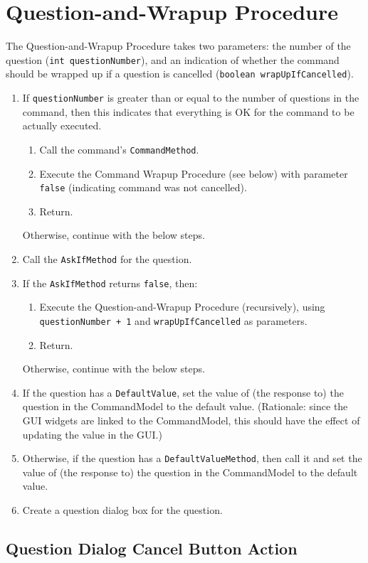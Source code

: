 \documentclass[11pt]{article}
\begin{document}
\section{Question-and-Wrapup Procedure}

The Question-and-Wrapup Procedure takes two parameters: the number of the
question ({\tt int questionNumber}), and an indication of whether the
command should be wrapped up if a question is cancelled
({\tt boolean wrapUpIfCancelled}).

\begin{enumerate}
\item If {\tt questionNumber} is greater than or equal to the number
  of questions in the command, then this indicates that everything
  is OK for the command to be actually executed.
  \begin{enumerate}
  \item Call the command's {\tt CommandMethod}.
  \item Execute the Command Wrapup Procedure (see below) with parameter
    {\tt false} (indicating command was not cancelled).
  \item Return.
  \end{enumerate}
  Otherwise, continue with the below steps.
\item Call the {\tt AskIfMethod} for the question.
\item If the {\tt AskIfMethod} returns {\tt false}, then:
  \begin{enumerate}
  \item Execute the Question-and-Wrapup Procedure
    (recursively), using {\tt questionNumber + 1} and {\tt wrapUpIfCancelled}
    as parameters.
  \item Return.
  \end{enumerate}
  Otherwise, continue with the below steps.
\item If the question  has a {\tt DefaultValue}, set the value of
  (the response to) the question in the CommandModel to the default value.
  (Rationale:  since the GUI widgets are linked to the CommandModel,
  this should have the effect of updating the value in the GUI.)
\item Otherwise, if the question has a {\tt DefaultValueMethod}, then call it
  and set the value of (the response to) the question in the CommandModel to
  the default value.
\item Create a question dialog box for the question.
\end{enumerate}

\subsection{Question Dialog Cancel Button Action}
\end{document}
